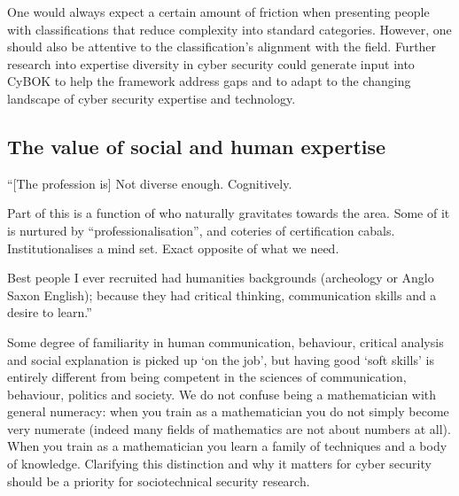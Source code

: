 \documentclass[
  a4paper,
]{book}
\begin{document}
One would always expect a certain amount of friction when presenting
people with classifications that reduce complexity into standard
categories. However, one should also be attentive to the
classification's alignment with the field. Further research into
expertise diversity in cyber security could generate input into CyBOK to
help the framework address gaps and to adapt to the changing landscape
of cyber security expertise and technology.

\subsection{The value of social and human
expertise}\label{the-value-of-social-and-human-expertise}

\begin{tcolorbox}[enhanced jigsaw, leftrule=.75mm, colframe=quarto-callout-note-color-frame, opacityback=0, breakable, left=2mm, rightrule=.15mm, bottomrule=.15mm, colback=white, arc=.35mm, toprule=.15mm]

``{[}The profession is{]} Not diverse enough. Cognitively.

Part of this is a function of who naturally gravitates towards the area.
Some of it is nurtured by ``professionalisation'', and coteries of
certification cabals. Institutionalises a mind set. Exact opposite of
what we need.

Best people I ever recruited had humanities backgrounds (archeology or
Anglo Saxon English); because they had critical thinking, communication
skills and a desire to learn.''

\end{tcolorbox}

Some degree of familiarity in human communication, behaviour, critical
analysis and social explanation is picked up `on the job', but having
good `soft skills' is entirely different from being competent in the
sciences of communication, behaviour, politics and society. We do not
confuse being a mathematician with general numeracy: when you train as a
mathematician you do not simply become very numerate (indeed many fields
of mathematics are not about numbers at all). When you train as a
mathematician you learn a family of techniques and a body of knowledge.
Clarifying this distinction and why it matters for cyber security should
be a priority for sociotechnical security research.
\end{document}
